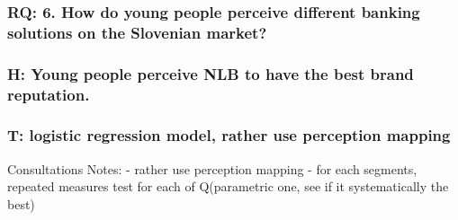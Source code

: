 \documentclass[
]{article}
\begin{document}
\hypertarget{rq-6.-how-do-young-people-perceive-different-banking-solutions-on-the-slovenian-market}{%
\subsubsection{RQ: 6. How do young people perceive different banking
solutions on the Slovenian
market?}\label{rq-6.-how-do-young-people-perceive-different-banking-solutions-on-the-slovenian-market}}

\hypertarget{h-young-people-perceive-nlb-to-have-the-best-brand-reputation.}{%
\subsubsection{H: Young people perceive NLB to have the best brand
reputation.}\label{h-young-people-perceive-nlb-to-have-the-best-brand-reputation.}}

\hypertarget{t-logistic-regression-model-rather-use-perception-mapping}{%
\subsubsection{T: logistic regression model, rather use perception
mapping}\label{t-logistic-regression-model-rather-use-perception-mapping}}

Consultations Notes: - rather use perception mapping - for each
segments, repeated measures test for each of Q(parametric one, see if it
systematically the best)
\end{document}
